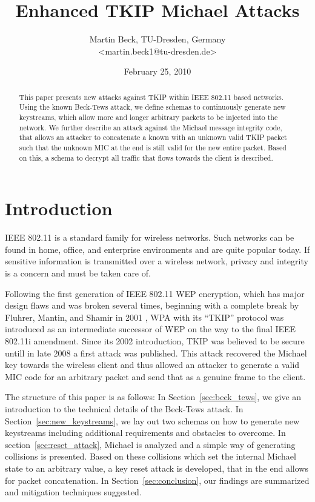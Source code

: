 \documentclass[a4paper,10pt]{scrartcl}
\title{Enhanced TKIP Michael Attacks}
\author{Martin Beck, TU-Dresden, Germany\\
\textless martin.beck1@tu-dresden.de\textgreater}
\date{February 25, 2010}
\begin{document}
\maketitle

\begin{abstract}

This paper presents new attacks against TKIP within IEEE 802.11 based networks. Using the known Beck-Tews attack, we define schemas to continuously generate new keystreams, which allow more and longer arbitrary packets to be injected into the network. We further describe an attack against the Michael message integrity code, that allows an attacker to concatenate a known with an unknown valid TKIP packet such that the unknown MIC at the end is still valid for the new entire packet. Based on this, a schema to decrypt all traffic that flows towards the client is described.

\end{abstract}

\section{Introduction}
\label{sec:intro}


IEEE 802.11\citep{IEEE07} is a standard family for wireless networks. Such networks can be found in home, office, and enterprise environments and
are quite popular today. If sensitive information is transmitted over a wireless network, privacy and integrity is a concern
and must be taken care of.

Following the first generation of IEEE 802.11 WEP encryption, which has major design flaws and was broken several times, beginning with
a complete break by Fluhrer, Mantin, and Shamir in 2001 \citep{FMS01}, WPA with its ``TKIP'' protocol was introduced as an intermediate
successor of WEP on the way to the final IEEE 802.11i amendment. Since its 2002 introduction, TKIP was believed to be secure untill
in late 2008 a first attack was published. This attack recovered the Michael key towards the wireless client and thus allowed an attacker to
generate a valid MIC code for an arbitrary packet and send that as a genuine frame to the client.

The structure of this paper is as follows: In Section~\ref{sec:beck_tews}, we give an introduction to the
technical details of the Beck-Tews attack. In Section~\ref{sec:new_keystreams}, we lay out two schemas on how to generate new keystreams
including additional requirements and obstacles to overcome. In section~\ref{sec:reset_attack}, Michael is analyzed and a simple way
of generating collisions is presented. Based on these collisions which set the internal Michael state to an arbitrary value, a
key reset attack is developed, that in the end allows for packet concatenation. In Section~\ref{sec:conclusion}, our findings are
summarized and mitigation techniques suggested.
\end{document}
